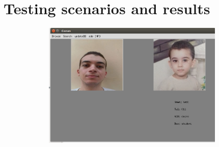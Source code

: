 \documentclass[pdftex,10pt,a4paper,oneside]{article}
\begin{document}
	
	 
	
	
	
	\pagebreak
	\section{Testing scenarios and results}
	\begin{figure}[H]
		\centering
		\includegraphics[width=120mm,height=60mm]{fig/17.png}
	\end{figure}
	
\end{document}
